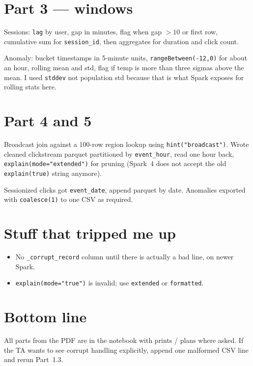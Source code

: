 \documentclass[11pt]{article}
\begin{document}
\section*{Part 3 --- windows}
Sessions: \texttt{lag} by user, gap in minutes, flag when gap $>10$ or first row, cumulative sum for \texttt{session\_id}, then aggregates for duration and click count.

Anomaly: bucket timestamps in 5-minute units, \texttt{rangeBetween(-12,0)} for about an hour, rolling mean and std, flag if temp is more than three sigmas above the mean. I used \texttt{stddev} not population std because that is what Spark exposes for rolling stats here.

\section*{Part 4 and 5}
Broadcast join against a 100-row region lookup using \texttt{hint("broadcast")}. Wrote cleaned clickstream parquet partitioned by \texttt{event\_hour}, read one hour back, \texttt{explain(mode="extended")} for pruning (Spark~4 does not accept the old \texttt{explain(true)} string anymore).

Sessionized clicks got \texttt{event\_date}, append parquet by date. Anomalies exported with \texttt{coalesce(1)} to one CSV as required.

\section*{Stuff that tripped me up}
\begin{itemize}
  \item No \texttt{\_corrupt\_record} column until there is actually a bad line, on newer Spark.
  \item \texttt{explain(mode="true")} is invalid; use \texttt{extended} or \texttt{formatted}.
\end{itemize}

\section*{Bottom line}
All parts from the PDF are in the notebook with prints / plans where asked. If the TA wants to see corrupt handling explicitly, append one malformed CSV line and rerun Part~1.3.
\end{document}

